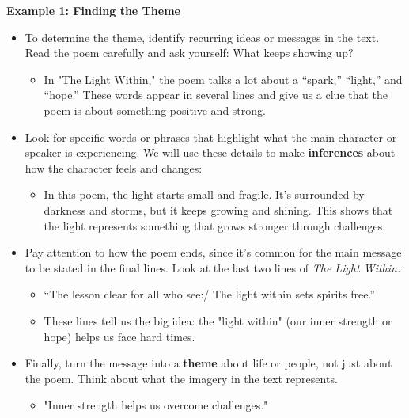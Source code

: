 \documentclass[12pt]{article}
\begin{document}
\begin{tcolorbox}[colframe=black!60, colback=white, 
coltitle=black, colbacktitle=black!15, fonttitle=\bfseries\Large, 
title=Examples, halign title=center, left=10pt, right=10pt, top=10pt, bottom=15pt]

\textbf{Example 1: Finding the Theme}  
\begin{itemize}
    \item To determine the theme, identify recurring ideas or messages in the text. Read the poem carefully and ask yourself: What keeps showing up? 
    \begin{itemize}
        \item In "The Light Within," the poem talks a lot about a “spark,” “light,” and “hope.” These words appear in several lines and give us a clue that the poem is about something positive and strong.
    \end{itemize}
    \item Look for specific words or phrases that highlight what the main character or speaker is experiencing. We will use these details to make \textbf{inferences} about how the character feels and changes:
    \begin{itemize}
        \item In this poem, the light starts small and fragile. It’s surrounded by darkness and storms, but it keeps growing and shining. This shows that the light represents something that grows stronger through challenges. 
    \end{itemize}
    \item Pay attention to how the poem ends, since it's common for the main message to be stated in the final lines. Look at the last two lines of \textit{The Light Within:}
    \begin{itemize}
        \item “The lesson clear for all who see:/ The light within sets spirits free.” 
        \item These lines tell us the big idea: the "light within" (our inner strength or hope) helps us face hard times. 
    \end{itemize}
\item Finally, turn the message into a \textbf{theme} about life or people, not just about the poem. Think about what the imagery in the text represents.
\begin{itemize}
    \item "Inner strength helps us overcome challenges."
\end{itemize}
\end{itemize}

\end{tcolorbox}
\end{document}
